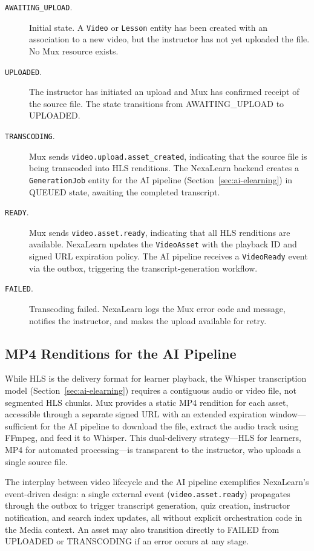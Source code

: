 \begin{description}
  \item[\texttt{AWAITING\_UPLOAD}.] Initial state. A \texttt{Video} or \texttt{Lesson} entity has been created with an association to a new video, but the instructor has not yet uploaded the file. No Mux resource exists.
  \item[\texttt{UPLOADED}.] The instructor has initiated an upload and Mux has confirmed receipt of the source file. The state transitions from AWAITING\_UPLOAD to UPLOADED.
  \item[\texttt{TRANSCODING}.] Mux sends \texttt{video.upload.asset\_created}, indicating that the source file is being transcoded into HLS renditions. The NexaLearn backend creates a \texttt{GenerationJob} entity for the AI pipeline (Section~\ref{sec:ai-elearning}) in QUEUED state, awaiting the completed transcript.
  \item[\texttt{READY}.] Mux sends \texttt{video.asset.ready}, indicating that all HLS renditions are available. NexaLearn updates the \texttt{VideoAsset} with the playback ID and signed URL expiration policy. The AI pipeline receives a \texttt{VideoReady} event via the outbox, triggering the transcript-generation workflow.
  \item[\texttt{FAILED}.] Transcoding failed. NexaLearn logs the Mux error code and message, notifies the instructor, and makes the upload available for retry.
\end{description}

\subsection{MP4 Renditions for the AI Pipeline}

While HLS is the delivery format for learner playback, the Whisper transcription model (Section~\ref{sec:ai-elearning}) requires a contiguous audio or video file, not segmented HLS chunks. Mux provides a static MP4 rendition for each asset, accessible through a separate signed URL with an extended expiration window---sufficient for the AI pipeline to download the file, extract the audio track using FFmpeg, and feed it to Whisper. This dual-delivery strategy---HLS for learners, MP4 for automated processing---is transparent to the instructor, who uploads a single source file.

The interplay between video lifecycle and the AI pipeline exemplifies NexaLearn's event-driven design: a single external event (\texttt{video.asset.ready}) propagates through the outbox to trigger transcript generation, quiz creation, instructor notification, and search index updates, all without explicit orchestration code in the Media context. An asset may also transition directly to FAILED from UPLOADED or TRANSCODING if an error occurs at any stage.
